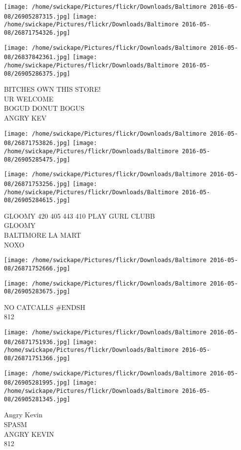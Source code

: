 \documentclass[10pt,letterpaper]{article}
\begin{document}
\texttt{[image: /home/swickape/Pictures/flickr/Downloads/Baltimore 2016-05-08/26905287315.jpg]}
\texttt{[image: /home/swickape/Pictures/flickr/Downloads/Baltimore 2016-05-08/26871754326.jpg]}

\texttt{[image: /home/swickape/Pictures/flickr/Downloads/Baltimore 2016-05-08/26837842361.jpg]}
\texttt{[image: /home/swickape/Pictures/flickr/Downloads/Baltimore 2016-05-08/26905286375.jpg]}

BITCHES OWN THIS STORE!\\
UR WELCOME\\
BOGUD DONUT BOGUS\\
ANGRY KEV
\pagebreak

\texttt{[image: /home/swickape/Pictures/flickr/Downloads/Baltimore 2016-05-08/26871753826.jpg]}
\texttt{[image: /home/swickape/Pictures/flickr/Downloads/Baltimore 2016-05-08/26905285475.jpg]}

\texttt{[image: /home/swickape/Pictures/flickr/Downloads/Baltimore 2016-05-08/26871753256.jpg]}
\texttt{[image: /home/swickape/Pictures/flickr/Downloads/Baltimore 2016-05-08/26905284615.jpg]}

GLOOMY 420 405 443 410 PLAY GURL CLUBB\\
GLOOMY\\
BALTIMORE LA MART\\
NOXO
\pagebreak

\texttt{[image: /home/swickape/Pictures/flickr/Downloads/Baltimore 2016-05-08/26871752666.jpg]}

\vspace{0.25in}
\texttt{[image: /home/swickape/Pictures/flickr/Downloads/Baltimore 2016-05-08/26905283675.jpg]}

NO CATCALLS \#ENDSH\\
812
\pagebreak

\texttt{[image: /home/swickape/Pictures/flickr/Downloads/Baltimore 2016-05-08/26871751936.jpg]}
\texttt{[image: /home/swickape/Pictures/flickr/Downloads/Baltimore 2016-05-08/26871751366.jpg]}

\texttt{[image: /home/swickape/Pictures/flickr/Downloads/Baltimore 2016-05-08/26905281995.jpg]}
\texttt{[image: /home/swickape/Pictures/flickr/Downloads/Baltimore 2016-05-08/26905281345.jpg]}

Angry Kevin\\
SPASM\\
ANGRY KEVIN\\
812
\pagebreak
\end{document}
